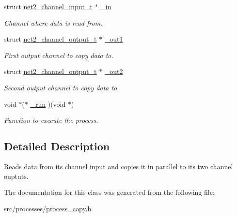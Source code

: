 \begin{DoxyCompactItemize}
\item 
\hypertarget{structprocess__copy__int__t_a81c5105a6213d656c8a927e1438be22b}{struct \hyperlink{structnet2__channel__input__t}{net2\-\_\-channel\-\_\-input\-\_\-t} $\ast$ \hyperlink{structprocess__copy__int__t_a81c5105a6213d656c8a927e1438be22b}{\-\_\-in}}\label{structprocess__copy__int__t_a81c5105a6213d656c8a927e1438be22b}

\begin{DoxyCompactList}\small\item\em Channel where data is read from. \end{DoxyCompactList}\item 
\hypertarget{structprocess__copy__int__t_a291f78ff424b5a6275d71a5c75397e74}{struct \hyperlink{structnet2__channel__output__t}{net2\-\_\-channel\-\_\-output\-\_\-t} $\ast$ \hyperlink{structprocess__copy__int__t_a291f78ff424b5a6275d71a5c75397e74}{\-\_\-out1}}\label{structprocess__copy__int__t_a291f78ff424b5a6275d71a5c75397e74}

\begin{DoxyCompactList}\small\item\em First output channel to copy data to. \end{DoxyCompactList}\item 
\hypertarget{structprocess__copy__int__t_a8f36052501a43e82f2924efa2d04b844}{struct \hyperlink{structnet2__channel__output__t}{net2\-\_\-channel\-\_\-output\-\_\-t} $\ast$ \hyperlink{structprocess__copy__int__t_a8f36052501a43e82f2924efa2d04b844}{\-\_\-out2}}\label{structprocess__copy__int__t_a8f36052501a43e82f2924efa2d04b844}

\begin{DoxyCompactList}\small\item\em Second output channel to copy data to. \end{DoxyCompactList}\item 
\hypertarget{structprocess__copy__int__t_ad8f7df5716069119c549664a0174f379}{void $\ast$($\ast$ \hyperlink{structprocess__copy__int__t_ad8f7df5716069119c549664a0174f379}{\-\_\-run} )(void $\ast$)}\label{structprocess__copy__int__t_ad8f7df5716069119c549664a0174f379}

\begin{DoxyCompactList}\small\item\em Function to execute the process. \end{DoxyCompactList}\end{DoxyCompactItemize}


\subsection{Detailed Description}
Reads data from its channel input and copies it in parallel to its two channel ouptuts. 

The documentation for this class was generated from the following file\-:\begin{DoxyCompactItemize}
\item 
src/processes/\hyperlink{process__copy_8h}{process\-\_\-copy.\-h}\end{DoxyCompactItemize}
